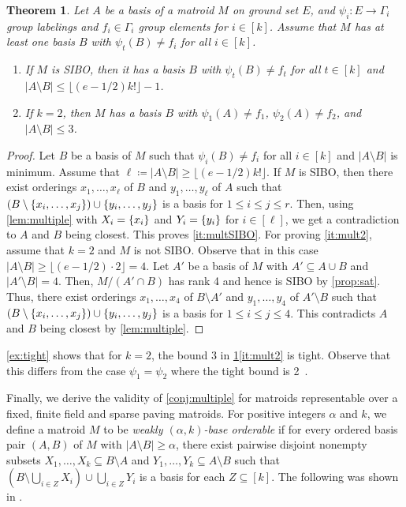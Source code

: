 \documentclass{article}
\DeclarePairedDelimiter{\set}{\{}{\}}
\newtheorem{theorem}{Theorem}[section]
\theoremstyle{definition}
\begin{document}
\begin{theorem} \label{thm:mult}
Let $A$ be a basis of a matroid $M$ on ground set $E$, and $\psi_i\colon E \to \Gamma_i$ group labelings and $f_i \in \Gamma_i$ group elements for $i \in [k]$.
Assume that $M$ has at least one basis $B$ with $\psi_t(B) \ne f_i$ for all $i \in [k]$.
\begin{enumerate}[label=(\roman*)]
\item If $M$ is SIBO, then it has a basis $B$ with $\psi_t(B) \ne f_t$ for all $t \in [k]$ and $|A\setminus B| \le \lfloor (e-1/2)k!\rfloor-1$. \label{it:multSIBO}
\item If $k=2$, then $M$ has a basis $B$ with $\psi_1(A) \ne f_1$, $\psi_2(A) \ne f_2$, and $|A\setminus B| \le 3$. \label{it:mult2}
\end{enumerate}
\end{theorem}
\begin{proof}
Let $B$ be a basis of $M$ such that $\psi_i(B)\ne f_i$ for all $i \in [k]$ and $|A\setminus B|$ is minimum.
Assume that $\ell \coloneqq |A\setminus B| \ge \lfloor (e-1/2)k!\rfloor$. If $M$ is SIBO, then there exist orderings $x_1,\dots, x_\ell$ of $B$ and $y_1,\dots, y_\ell$ of $A$ such that $(B\setminus \set{x_i,\dots, x_j})\cup \set{y_i,\dots, y_j}$ is a basis for $1 \le i \le j \le r$. Then, using \cref{lem:multiple} with $X_i = \set{x_i}$ and $Y_i = \set{y_i}$ for $i \in [\ell]$, we get a contradiction to $A$ and $B$ being closest. This proves \ref{it:multSIBO}.
For proving \ref{it:mult2}, assume that $k=2$ and $M$ is not SIBO. Observe that in this case $|A\setminus B| \ge \lfloor (e-1/2) \cdot 2\rfloor  = 4$.
Let $A'$ be a basis of $M$ with $A'\subseteq A\cup B$ and $|A'\setminus B| = 4$.
Then, $M/(A'\cap B)$ has rank 4 and hence is SIBO by \cref{prop:sat}.
Thus, there exist orderings $x_1,\dots, x_4$ of $B\setminus A'$ and $y_1,\dots, y_4$ of $A' \setminus B$ such that $(B\setminus \set{x_i,\dots, x_j})\cup \set{y_i,\dots, y_j}$ is a basis for $1 \le i \le j \le 4$. This contradicts $A$ and $B$ being closest by \cref{lem:multiple}. 
\end{proof}

\cref{ex:tight} shows that for $k=2$, the bound 3 in \cref{thm:mult}\ref{it:mult2} is tight. Observe that this differs from the case $\psi_1 = \psi_2$ where the tight bound is 2~\cite{horsch2024problems}.

Finally, we derive the validity of \cref{conj:multiple} for matroids representable over a fixed, finite field and sparse paving matroids.
For positive integers $\alpha$ and $k$, we define a matroid $M$ to be \emph{weakly $(\alpha,k)$-base orderable} if for every ordered basis pair $(A,B)$ of $M$ with $|A\setminus B|\ge \alpha$, there exist pairwise disjoint nonempty subsets $X_1,\dots, X_k \subseteq B \setminus A$ and $Y_1, \dots, Y_k \subseteq A \setminus B$ such that $\left(B \setminus \bigcup_{i\in Z} X_i\right) \cup \bigcup_{i \in Z} Y_i$ is a basis for each $Z \subseteq [k]$. The following was shown in \cite{horsch2024problems}.
\end{document}
